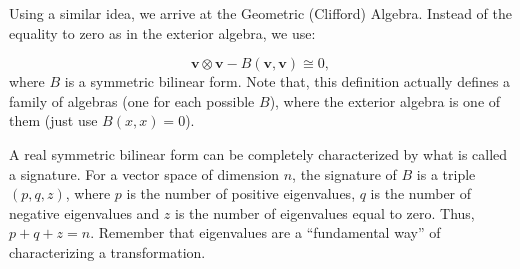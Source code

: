 Using a similar idea, we arrive at the Geometric (Clifford) Algebra.
Instead of the equality to zero as in the exterior algebra,
we use:

\begin{displaymath}
	\mathbf{v} \otimes \mathbf{v} - B(\mathbf v, \mathbf v) \cong 0,
\end{displaymath}
where $B$ is a symmetric bilinear form.
Note that, this definition actually defines a family of algebras (one
for each possible $B$), where the exterior algebra is one of them (just
use $B(x,x) = 0$).

A real symmetric bilinear form can be completely characterized by
what is called a signature.
For a vector space of dimension $n$,
the signature of $B$ is a triple $(p,q,z)$, where $p$ is the number
of positive eigenvalues, $q$ is the number of negative eigenvalues and
$z$ is the number of eigenvalues equal to zero. Thus, $p+q+z = n$.
Remember that eigenvalues are a ``fundamental way'' of characterizing
a transformation.
